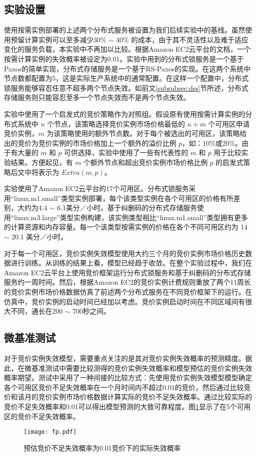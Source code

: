 \subsection{实验设置}
使用按需实例部署的上述两个分布式服务被设置为我们后续实验中的基线。虽然使用预留计算实例可以至多减少30\% $\sim$ 40\% 的成本，由于其不灵活性以及难于适应变化的服务负载，本实验中不再加以比较。根据Amazon EC2云平台的文档\cite{AWS_SLA:2014}，一个按需计算实例的失效概率被设定为0.01。实验中用到的分布式锁服务是一个基于Paxos的简单实现，分布式存储服务是一个基于RS-Paxos的实现\cite{Mu:2014:PME:2600212.2600218}。在这两个系统中节点数都配置为5，这是实际生产系统中的通常配置\cite{Burrows:2006:CLS:1298455.1298487, Mu:2014:PME:2600212.2600218}。在这样一个配置中，分布式锁服务能够容忍任意不超多两个节点失效。如前文\ref{subsubsec:dss}节所述，分布式存储服务则只能容忍至多一个节点失效而不是两个节点失效。

实验中使用了一个启发式的竞价策略作为对照组。假设原有使用按需计算实例的分布式系统中 $n$ 个节点，该策略选择竞价实例市场价格最低的 $n + m$ 个可用区申请竞价实例，$m$ 为该策略使用的额外节点数。对于每个被选出的可用区，该策略给出的竞价为竞价实例的市场价格加上一个额外的溢价比例 $p$，如：10\%或20\%。由于有大量的 $m$ 和 $p$ 可供选择，实验中使用了一些有代表性的 $m$ 和 $p$ 用于比较实验结果。方便起见，有 $m$ 个额外节点和超出竞价实例市场价格比例 $p$ 的启发式策略后文中将表示为 $Extra(m, p)$。

实验使用了Amazon EC2云平台的17个可用区。分布式锁服务采用``linux.m1.small''类型实例部署，每个该类型实例在各个可用区的价格有所差别，大约为4.4 $\sim$ 6.1美分／小时。基于纠删码的分布式存储服务使用``linux.m3.large''类型实例构建，该实例类型相比``linux.m1.small''类型拥有更多的计算资源和内存容量。每一个该类型按需实例的价格在各个不同可用区约为 14 $\sim$ 20.1 美分／小时。

对于每一个可用区，竞价实例失效模型使用大约三个月的竞价实例市场价格历史数据进行训练。从训练的结果上看，模型已经趋于收敛。在整个实验过程中，我们在Amazon EC2云平台上使用竞价框架运行分布式锁服务和基于纠删码的分布式存储服务约一周时间。然后，根据Amazon EC2的竞价实例计费规则重放了两个11周长的竞价实例市场价格数据仿真了前述两个分布式服务在不同竞价框架下的运行。在仿真中，竞价实例的启动时间已经加以考虑。竞价实例启动时间在不同区域间有很大不同，通长在200 $\sim$ 700秒之间\cite{Mao:2012:PSV:2353730.2353859}。

\subsection{微基准测试}
对于竞价实例失效模型，需要重点关注的是其对竞价实例失效概率的预测精度。据此，在微基准测试中需要比较测得的竞价实例失效概率和模型预估的竞价实例失效概率期望。测试中采用了一种间接的比较方式：先使用竞价实例失效模型模型确定各个可用区竞价不足失效概率在一个月时间内不超过0.01的竞价，然后通过比较竞价和该月的竞价实例市场价格数据计算实际的竞价不足失效概率。通过比较实际的竞价不足失效概率和0.01可以得出模型预测的大致可靠程度。图\ref{figure:fp}显示了在5个可用区的竞价不足失效概率。
\begin{figure}
  \centering
  \texttt{[image: fp.pdf]}
  \caption{预估竞价不足失效概率为0.01竞价下的实际失效概率}
  \label{figure:fp}
\end{figure}

